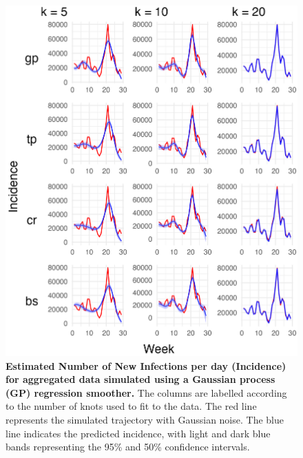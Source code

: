 \documentclass[
11pt, %
oneside, %
english, %
singlespacing, %
]{macthesis} %
\begin{document}
\begin{figure}[H]
\centering
\includegraphics[width=\textwidth]{figure/Simulated/aggregated/simulation_agg_gp_20_k(5,10,20)_bsd1_beta1_plot_incidence.png}
\caption[Predicted Simulated and Aggregated Data (GP) Incidence]{\textbf{Estimated Number of New Infections per day (Incidence) for aggregated data simulated using a Gaussian process (GP) regression smoother.} The columns are labelled according to the number of knots used to fit to the data. The red line represents the simulated trajectory with Gaussian noise. The blue line indicates the predicted incidence, with light and dark blue bands representing the 95\% and 50\% confidence intervals.}
\label{fig:incidence_agg_20gp}
\end{figure}
\end{document}
